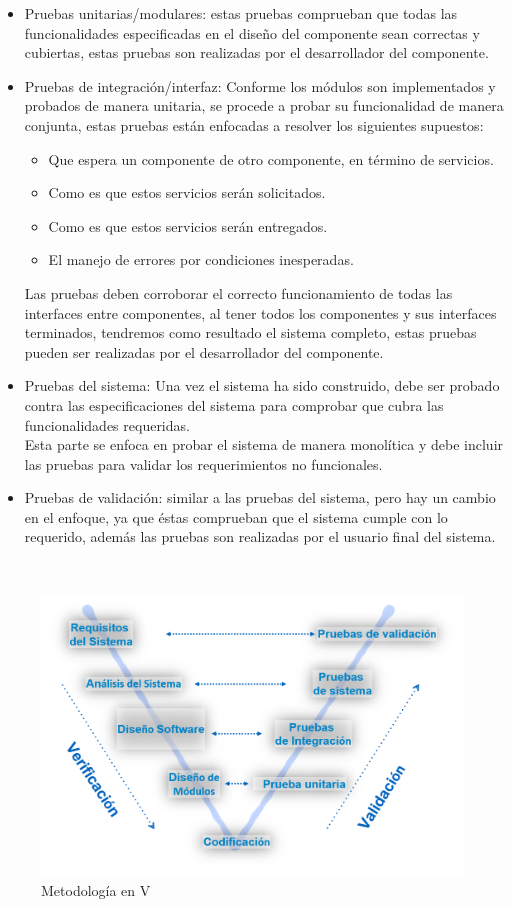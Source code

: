 \begin{itemize}

    \item Pruebas unitarias/modulares: estas pruebas comprueban que todas las funcionalidades especificadas en el diseño del componente sean correctas y cubiertas, estas pruebas son realizadas por el desarrollador del componente.
    
    \item Pruebas de integración/interfaz:
    Conforme los módulos son implementados y probados de manera unitaria, se procede a probar su funcionalidad de manera conjunta, estas pruebas están enfocadas a resolver los siguientes supuestos:
    
    \begin{itemize}
        \item Que espera un componente de otro componente, en término de servicios.
        \item Como es que estos servicios serán solicitados.
        \item Como es que estos servicios serán entregados.
        \item El manejo de errores por condiciones inesperadas.
    \end{itemize}
    
    Las pruebas deben corroborar el correcto funcionamiento de todas las interfaces entre componentes, al tener todos los componentes y sus interfaces terminados, tendremos como resultado el sistema completo, estas pruebas pueden ser realizadas por el desarrollador del componente.
    
    \item Pruebas del sistema: Una vez el sistema ha sido construido, debe ser probado contra las especificaciones del sistema para comprobar que cubra las funcionalidades requeridas.\\
    Esta parte se enfoca en probar el sistema de manera monolítica y debe incluir las pruebas para validar los requerimientos no funcionales.

    \item Pruebas de validación: similar a las pruebas del sistema, pero hay un cambio en el enfoque, ya que éstas comprueban que el sistema cumple con lo requerido, además las pruebas son realizadas por el usuario final del sistema.

\end{itemize}

\\
\begin{figure}[H]
	\centering
	\includegraphics[scale=.5]{Capitulo3/img/vmodel.png}
	\caption{Metodología en V}
	\label{fig:ModeloIncremental}
\end{figure}

